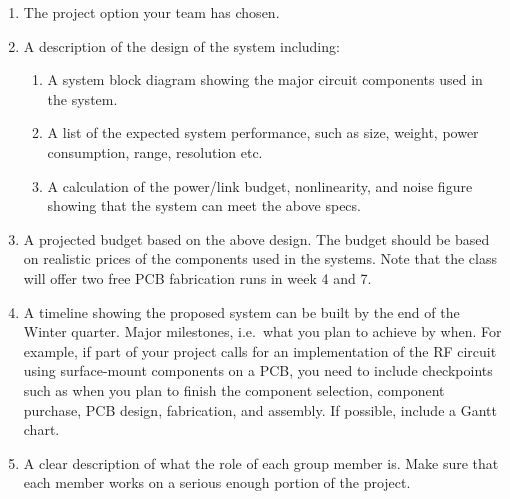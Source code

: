 \documentclass[letterpaper, 11pt]{article}
\begin{document}
\begin{enumerate}[itemsep=-0.1ex]
	\item The project option your team has chosen. 
	
	\item A description of the design of the system including:
		\begin{enumerate}[itemsep=-0.1ex]
			\item A system block diagram showing the major circuit components used in the system.
			
			\item A list of the expected system performance, such as size, weight, power consumption, range, resolution etc. 
			
			\item A calculation of the power/link budget, nonlinearity, and noise figure showing that the system can meet the above specs. 
			
		\end{enumerate}
	
	\item A projected budget based on the above design. The budget should be based on realistic prices of the components used in the systems. Note that the class will offer two free PCB fabrication runs in week 4 and 7. 
	
	\item A timeline showing the proposed system can be built by the end of the Winter quarter. Major milestones, i.e.~what you plan to achieve by when. For example, if part of your project calls for an implementation of the RF circuit using surface-mount components on a PCB, you need to include checkpoints such as when you plan to finish the component selection, component purchase, PCB design, fabrication, and assembly. If possible, include a Gantt chart. 
	 
	\item A clear description of what the role of each group member is. Make sure that each member works on a serious enough portion of the project. 
\end{enumerate} 
\end{document}
